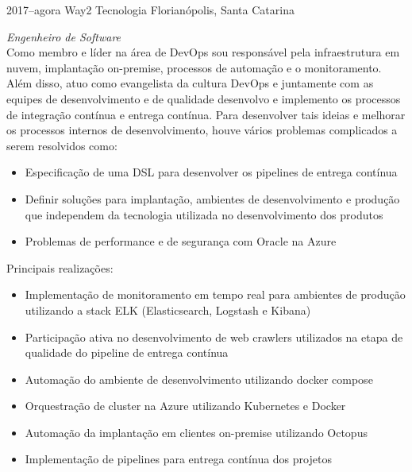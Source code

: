 \documentclass[]{friggeri-cv} %
\begin{document}
\begin{entrylist}
\entry
{2017--agora}
{Way2 Tecnologia}
{Florianópolis, Santa Catarina}
{\emph{Engenheiro de Software} \\

    Como membro e líder na área de DevOps sou responsável pela infraestrutura em nuvem, implantação on-premise,
    processos de automação e o monitoramento. Além disso, atuo como evangelista da cultura DevOps e juntamente com as equipes de desenvolvimento e
    de qualidade desenvolvo e implemento os processos de integração contínua e entrega contínua. Para desenvolver tais ideias e melhorar os processos
    internos de desenvolvimento, houve vários problemas complicados a serem resolvidos como:

\begin{itemize}
    \item Especificação de uma DSL para desenvolver os pipelines de entrega contínua
    \item Definir soluções para implantação, ambientes de desenvolvimento e produção que independem da tecnologia utilizada no desenvolvimento dos produtos
    \item Problemas de performance e de segurança com Oracle na Azure
\end{itemize}

Principais realizações:\\

\begin{itemize}
    \item Implementação de monitoramento em tempo real para ambientes de produção utilizando a stack ELK (Elasticsearch, Logstash e Kibana)
    \item Participação ativa no desenvolvimento de web crawlers utilizados na etapa de qualidade do pipeline de entrega contínua
    \item Automação do ambiente de desenvolvimento utilizando docker compose
    \item Orquestração de cluster na Azure utilizando Kubernetes e Docker
    \item Automação da implantação em clientes on-premise utilizando Octopus
    \item Implementação de pipelines para entrega contínua dos projetos
\end{itemize}

}
\end{entrylist}
\end{document}

